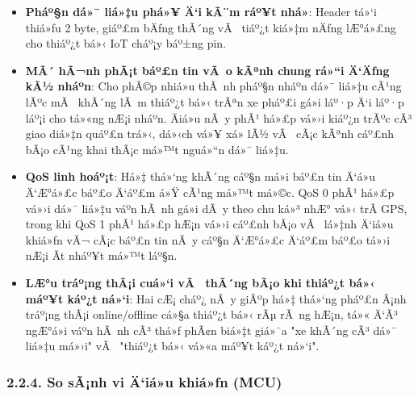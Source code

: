 \documentclass[a4paper]{extarticle}
\providecommand{\tightlist}{%
  \setlength{\itemsep}{0pt}\setlength{\parskip}{0pt}}
\begin{document}
\begin{itemize}
\tightlist
\item
  \textbf{Pháº§n dá»¯ liá»‡u phá»¥ Ä‘i kÃ¨m ráº¥t nhá»}: Header tá»‘i thiá»ƒu 2 byte, giáº£m bÄƒng thÃ´ng vÃ 
  tiáº¿t kiá»‡m nÄƒng lÆ°á»£ng cho thiáº¿t bá»‹ IoT cháº¡y báº±ng pin.
\item
  \textbf{MÃ´ hÃ¬nh phÃ¡t báº£n tin vÃ o kÃªnh chung rá»“i Ä‘Äƒng kÃ½ nháº­n}: Cho phÃ©p nhiá»u thÃ nh pháº§n nháº­n dá»¯
  liá»‡u cÃ¹ng lÃºc mÃ  khÃ´ng lÃ m thiáº¿t bá»‹ trÃªn xe pháº£i gá»­i láº·p Ä‘i láº·p láº¡i
  cho tá»«ng nÆ¡i nháº­n. Äiá»u nÃ y phÃ¹ há»£p vá»›i kiáº¿n trÃºc cÃ³ giao diá»‡n quáº£n trá»‹, dá»‹ch
  vá»¥ xá»­ lÃ½ vÃ  cÃ¡c kÃªnh cáº£nh bÃ¡o cÃ¹ng khai thÃ¡c má»™t nguá»“n dá»¯ liá»‡u.
\item
  \textbf{QoS linh hoáº¡t}: Há»‡ thá»‘ng khÃ´ng cáº§n má»i báº£n tin Ä‘á»u Ä‘Æ°á»£c báº£o
  Ä‘áº£m á»Ÿ cÃ¹ng má»™t má»©c. QoS 0 phÃ¹ há»£p vá»›i dá»¯ liá»‡u váº­n hÃ nh gá»­i dÃ y theo
  chu ká»³
  nhÆ° vá»‹ trÃ­ GPS, trong khi QoS 1 phÃ¹ há»£p hÆ¡n vá»›i cáº£nh bÃ¡o vÃ  lá»‡nh Ä‘iá»u
  khiá»ƒn vÃ¬ cÃ¡c báº£n tin nÃ y cáº§n Ä‘Æ°á»£c Ä‘áº£m báº£o tá»›i nÆ¡i Ã­t nháº¥t má»™t láº§n.
\item
  \textbf{LÆ°u tráº¡ng thÃ¡i cuá»‘i vÃ  thÃ´ng bÃ¡o khi thiáº¿t bá»‹ máº¥t káº¿t ná»‘i}: Hai cÆ¡ cháº¿ nÃ y giÃºp há»‡ thá»‘ng
  pháº£n Ã¡nh tráº¡ng thÃ¡i online/offline cá»§a thiáº¿t bá»‹ rÃµ rÃ ng hÆ¡n, tá»« Ä‘Ã³
  ngÆ°á»i váº­n hÃ nh cÃ³ thá»ƒ phÃ¢n biá»‡t giá»¯a "xe khÃ´ng cÃ³ dá»¯ liá»‡u má»›i" vÃ 
  "thiáº¿t bá»‹ vá»«a máº¥t káº¿t ná»‘i".
\end{itemize}

\subsubsection{2.2.4. So sÃ¡nh vi Ä‘iá»u khiá»ƒn
(MCU)}\label{224-so-suxe1nh-vi-ux111iux1ec1u-khiux1ec3n-mcu}
\end{document}

